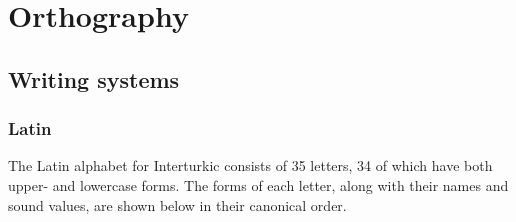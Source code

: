 \part{Orthography}

\chapter{Writing systems}

\section{Latin}

The Latin alphabet for Interturkic consists of 35 letters, 34 of which have both upper- and lowercase forms.
The forms of each letter, along with their names and sound values, are shown below in their canonical order.

